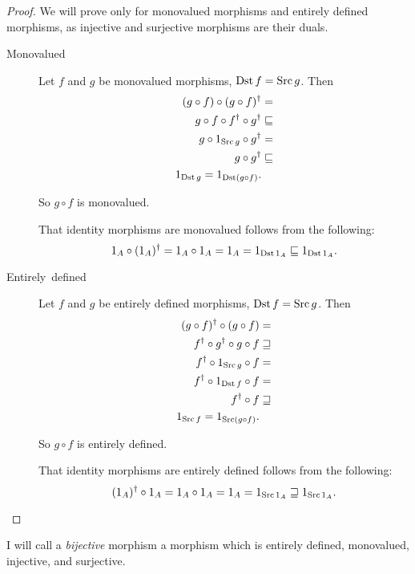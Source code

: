 \begin{proof}
We will prove only for monovalued morphisms and entirely defined morphisms,
as injective and surjective morphisms are their duals.
\begin{description}
\item [{Monovalued}] Let $f$ and $g$ be monovalued morphisms, $\operatorname{Dst} f=\operatorname{Src} g$.
Then
\begin{align*}
(g\circ f)\circ(g\circ f)^{\dagger} & =\\
g\circ f\circ f^{\dagger}\circ g^{\dagger} & \sqsubseteq\\
g\circ1_{\operatorname{Src} g}\circ g^{\dagger} & =\\
g\circ g^{\dagger} & \sqsubseteq\\
1_{\operatorname{Dst} g}=1_{\operatorname{Dst}(g\circ f)}.
\end{align*}



So $g\circ f$ is monovalued.


That identity morphisms are monovalued follows from the following:
\[
1_{A}\circ(1_{A})^{\dagger}=1_{A}\circ1_{A}=1_{A}=1_{\operatorname{Dst}1_{A}}\sqsubseteq1_{\operatorname{Dst}1_{A}}.
\]


\item [{Entirely~defined}] Let $f$ and $g$ be entirely defined morphisms,
$\operatorname{Dst} f=\operatorname{Src} g$. Then
\begin{align*}
(g\circ f)^{\dagger}\circ(g\circ f) & =\\
f^{\dagger}\circ g^{\dagger}\circ g\circ f & \sqsupseteq\\
f^{\dagger}\circ1_{\operatorname{Src} g}\circ f & =\\
f^{\dagger}\circ1_{\operatorname{Dst} f}\circ f & =\\
f^{\dagger}\circ f & \sqsupseteq\\
1_{\operatorname{Src} f}=1_{\operatorname{Src}(g\circ f)}.
\end{align*}



So $g\circ f$ is entirely defined.


That identity morphisms are entirely defined follows from the following:
\[
(1_{A})^{\dagger}\circ1_{A}=1_{A}\circ1_{A}=1_{A}=1_{\operatorname{Src}1_{A}}\sqsupseteq1_{\operatorname{Src}1_{A}}.
\]


\end{description}
\end{proof}
\begin{defn}
I will call a \emph{bijective} morphism
a morphism which is entirely defined, monovalued, injective, and surjective.\end{defn}
